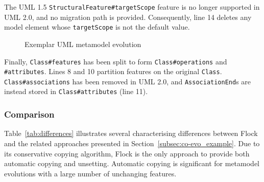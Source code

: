 The UML 1.5 \texttt{St\-ru\-ct\-ur\-alFe\-at\-ur\-e\#t\-ar\-g\-et\-Sc\-op\-e} feature is no longer supported in UML 2.0, and no migration path is provided. Consequently, line 14 deletes any model element whose \texttt{t\-ar\-g\-et\-Sc\-op\-e} is not the default value.

\begin{figure}
	\centering
	\caption{Exemplar UML metamodel evolution}
\label{fig:uml_mms}
\end{figure}

Finally, \texttt{C\-la\-ss\#fe\-at\-ur\-es} has been split to form \texttt{C\-la\-ss\#op\-er\-at\-io\-ns} and \texttt{\#at\-tr\-ib\-ut\-es}. Lines 8 and 10 partition features on the original \texttt{Cl\-a\-ss}. \texttt{Cl\-as\-s\#a\-ss\-oc\-ia\-ti\-on\-s} has been removed in UML 2.0, and \texttt{As\-so\-ci\-at\-i\-onEn\-d}s are instead stored in \texttt{Cl\-a\-ss\#at\-tr\-ib\-ut\-es} (line 11).


\subsubsection{Comparison}
Table~\ref{tab:differences} illustrates several characterising differences between Flock and the related approaches presented in Section~\ref{subsec:co-evo_example}. Due to its conservative copying algorithm, Flock is the only approach to provide both automatic copying and unsetting. Automatic copying is significant for metamodel evolutions with a large number of unchanging features.

